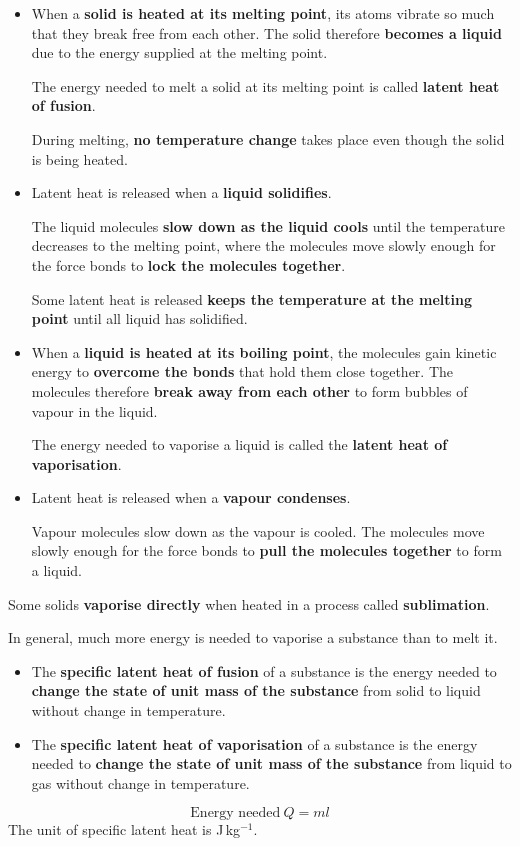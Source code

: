 \begin{itemize}
    \item When a \textbf{solid is heated at its melting point}, its atoms vibrate so much that they break free from each other. The solid therefore \textbf{becomes a liquid} due to the energy supplied at the melting point.

        The energy needed to melt a solid at its melting point is called \textbf{latent heat of fusion}.

        During melting, \textbf{no temperature change} takes place even though the solid is being heated.
    \item Latent heat is released when a \textbf{liquid solidifies}.

        The liquid molecules \textbf{slow down as the liquid cools} until the temperature decreases to the melting point, where the molecules move slowly enough for the force bonds to \textbf{lock the molecules together}.

        Some latent heat is released \textbf{keeps the temperature at the melting point} until all liquid has solidified.
    \item When a \textbf{liquid is heated at its boiling point}, the molecules gain kinetic energy to \textbf{overcome the bonds} that hold them close together. The molecules therefore \textbf{break away from each other} to form bubbles of vapour in the liquid.

        The energy needed to vaporise a liquid is called the \textbf{latent heat of vaporisation}.
    \item Latent heat is released when a \textbf{vapour condenses}.

        Vapour molecules slow down as the vapour is cooled. The molecules move slowly enough for the force bonds to \textbf{pull the molecules together} to form a liquid.
\end{itemize}

Some solids \textbf{vaporise directly} when heated in a process called \textbf{sublimation}.

In general, much more energy is needed to vaporise a substance than to melt it.
\begin{itemize}
    \item The \textbf{specific latent heat of fusion} of a substance is the energy needed to \textbf{change the state of unit mass of the substance} from solid to liquid without change in temperature.
    \item The \textbf{specific latent heat of vaporisation} of a substance is the energy needed to \textbf{change the state of unit mass of the substance} from liquid to gas without change in temperature.
\end{itemize}
$$\text{Energy needed}\ Q=ml$$
The unit of specific latent heat is J\,kg$^{-1}$.
